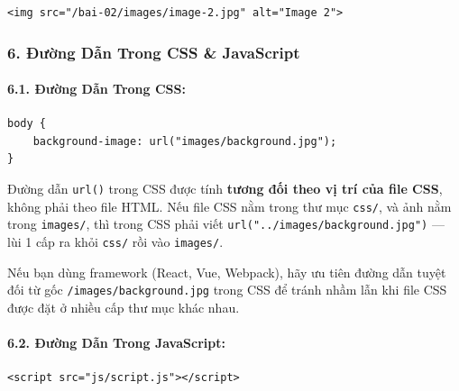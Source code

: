 \documentclass[11pt,oneside]{book}
\newcommand{\codeinline}[1]{\textcolor{accentOrange}{\texttt{#1}}}
\begin{document}
\begin{codeWindow}
\begin{lstlisting}[language=HTML5]
<img src="/bai-02/images/image-2.jpg" alt="Image 2">
\end{lstlisting}
\end{codeWindow}

\subsubsection{6. Đường Dẫn Trong CSS \& JavaScript}

\paragraph{6.1. Đường Dẫn Trong CSS:}

\begin{codeWindow}
\begin{lstlisting}[language=HTML5]
body {
    background-image: url("images/background.jpg");
}
\end{lstlisting}
\end{codeWindow}

\begin{noteBox}
Đường dẫn \codeinline{url()} trong CSS được tính \textbf{tương đối theo vị trí của file CSS}, không phải theo file HTML. Nếu file CSS nằm trong thư mục \codeinline{css/}, và ảnh nằm trong \codeinline{images/}, thì trong CSS phải viết \codeinline{url("../images/background.jpg")} — lùi 1 cấp ra khỏi \codeinline{css/} rồi vào \codeinline{images/}.
\end{noteBox}

\begin{tipBox}
Nếu bạn dùng framework (React, Vue, Webpack), hãy ưu tiên đường dẫn tuyệt đối từ gốc \codeinline{/images/background.jpg} trong CSS để tránh nhầm lẫn khi file CSS được đặt ở nhiều cấp thư mục khác nhau.
\end{tipBox}

\paragraph{6.2. Đường Dẫn Trong JavaScript:}

\begin{codeWindow}
\begin{lstlisting}[language=HTML5]
<script src="js/script.js"></script>
\end{lstlisting}
\end{codeWindow}
\end{document}
